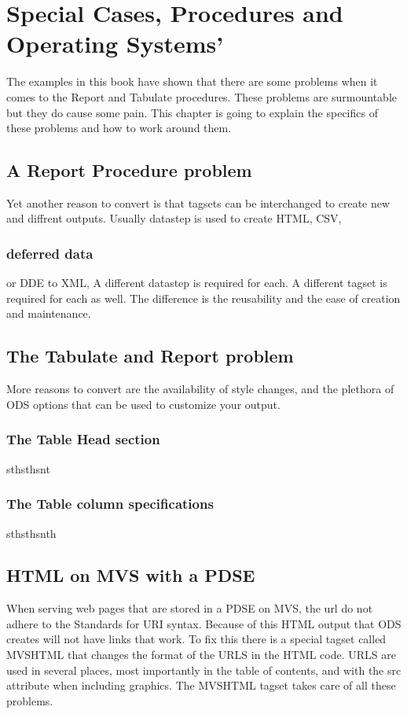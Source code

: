 \chapter{Special Cases, Procedures and Operating Systems'}
The examples in this book have shown that there are some problems
when it comes to the Report and Tabulate procedures.  These
problems are surmountable but they do cause some pain.  This
chapter is going to explain the specifics of these problems
and how to work around them.

\section{A Report Procedure problem}
Yet another reason to
convert is that tagsets can be interchanged to create new and 
diffrent outputs.  Usually datastep is used to create HTML, CSV,

\subsection{deferred data}
or DDE to XML,  A different datastep is required for each.  A different
tagset is required for each as well.  The difference is the reusability
and the ease of creation and maintenance.

\section{The Tabulate and Report problem}
More reasons to convert are the availability of style changes, and the
plethora of ODS options that can be used to customize your output.

\subsection{The Table Head section}
sthsthsnt

\subsection{The Table column specifications}
sthsthsnth

\section{HTML on MVS with a PDSE}
When serving web pages that are stored in a PDSE on MVS, the url do not
adhere to the Standards for URI syntax.  Because of this HTML output
that ODS creates will not have links that work.  To fix this there is
a special tagset called MVSHTML that changes the format of the URLS
in the HTML code.  URLS are used in several places, most importantly
in the table of contents, and with the src attribute when including
graphics.  The MVSHTML tagset takes care of all these problems.

